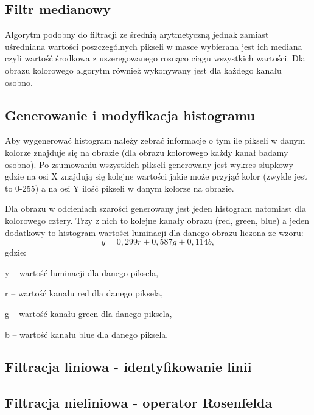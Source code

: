 \documentclass{classrep}
\begin{document}
\subsection{Filtr medianowy}
Algorytm podobny do filtracji ze średnią arytmetyczną jednak zamiast uśredniana wartości poszczególnych pikseli w masce wybierana jest ich mediana czyli wartość środkowa z uszeregowanego rosnąco ciągu wszystkich wartości. Dla obrazu kolorowego algorytm również wykonywany jest dla każdego kanału osobno.

\subsection{Generowanie i modyfikacja histogramu}
Aby wygenerować histogram należy zebrać informacje o tym ile pikseli w danym kolorze znajduje się na obrazie (dla obrazu kolorowego każdy kanał badamy osobno). Po zsumowaniu wszystkich pikseli generowany jest wykres słupkowy gdzie na osi X znajdują się kolejne wartości jakie może przyjąć kolor (zwykle jest to 0-255) a na osi Y ilość pikseli w danym kolorze na obrazie.

Dla obrazu w odcieniach szarości generowany jest jeden histogram natomiast dla kolorowego cztery. Trzy z nich to kolejne kanały obrazu (red, green, blue) a jeden dodatkowy to histogram wartości luminacji dla danego obrazu liczona ze wzoru:
\begin{equation}
 y = 0,299r + 0,587g + 0,114b, \label{luminacja}
 \end{equation}
gdzie:
\begin{description}
\item y -- wartość luminacji dla danego piksela,
\item r -- wartość kanału red dla danego piksela,
\item g -- wartość kanału green dla danego piksela,
\item b -- wartość kanału blue dla danego piksela.
\end{description}

\subsection{Filtracja liniowa - identyfikowanie linii}

\subsection{Filtracja nieliniowa - operator Rosenfelda}
\end{document}
